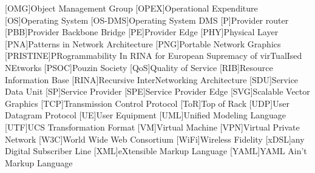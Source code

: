 \begin{acronym}[PRISTINE]
    [OMG]{Object Management Group}
    [OPEX]{Operational Expenditure}
    [OS]{Operating System}
    [OS-DMS]{Operating System DMS}
    [P]{Provider router}
    [PBB]{Provider Backbone Bridge}
    [PE]{Provider Edge}
    [PHY]{Physical Layer}
    [PNA]{Patterns in Network Architecture}
    [PNG]{Portable Network Graphics}
    [PRISTINE]{PRogrammability In RINA for European Supremacy of virTualIsed NEtworks}
    [PSOC]{Pouzin Society}
    [QoS]{Quality of Service}
    [RIB]{Resource Information Base}
    [RINA]{Recursive InterNetworking Architecture}
    [SDU]{Service Data Unit}
    [SP]{Service Provider}
    [SPE]{Service Provider Edge}
    [SVG]{Scalable Vector Graphics}
    [TCP]{Transmission Control Protocol}
    [ToR]{Top of Rack}
    [UDP]{User Datagram Protocol}
    [UE]{User Equipment}
    [UML]{Unified Modeling Language}
    [UTF]{UCS Transformation Format}
    [VM]{Virtual Machine}
    [VPN]{Virtual Private Network}
    [W3C]{World Wide Web Consortium}
    [WiFi]{Wireless Fidelity}
    [xDSL]{any Digital Subscriber Line}
    [XML]{eXtensible Markup Language}
    [YAML]{YAML Ain't Markup Language}
\end{acronym}
